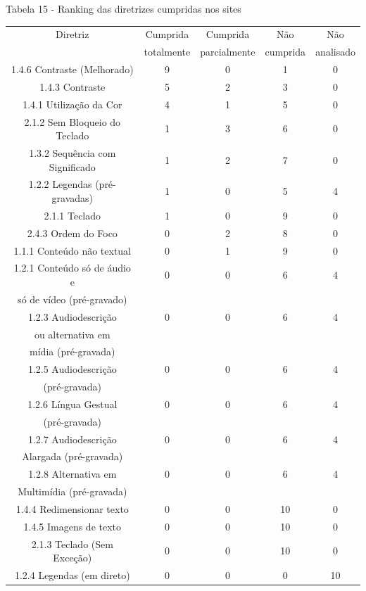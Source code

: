 \documentclass[a4paper]{article}
\begin{document}
\begin{titlepage}
Tabela 15 - Ranking das diretrizes cumpridas nos sites\\[-1cm]
\begin{center}
	\begin{longtable}{|c|c|c|c|c|}
		\hline
		Diretriz & Cumprida & Cumprida & Não & Não\\
		& totalmente & parcialmente & cumprida & analisado\\
		\hline
		1.4.6 Contraste (Melhorado) & 9 & 0 & 1 & 0 \\
		\hline
		1.4.3 Contraste & 5 & 2 & 3 & 0 \\
		\hline
		1.4.1 Utilização da Cor & 4 & 1 & 5 & 0 \\
		\hline
		2.1.2 Sem Bloqueio do Teclado & 1 & 3 & 6 & 0 \\
		\hline
		1.3.2 Sequência com Significado & 1 & 2 & 7 & 0 \\
		\hline
		1.2.2 Legendas (pré-gravadas) & 1 & 0 & 5 & 4 \\
		\hline
		2.1.1 Teclado & 1 & 0 & 9 & 0 \\
		\hline
		2.4.3 Ordem do Foco & 0 & 2 & 8 & 0 \\
		\hline
		1.1.1 Conteúdo não textual & 0 & 1 & 9 & 0 \\
		\hline
		1.2.1 Conteúdo só de áudio e & 0 & 0 & 6 & 4 \\
		só de vídeo (pré-gravado) & & & & \\
		\hline
		1.2.3 Audiodescrição & 0 & 0 & 6 & 4 \\
		ou alternativa em & & & & \\
		mídia (pré-gravada) & & & & \\
		\hline
		1.2.5 Audiodescrição & 0 & 0 & 6 & 4 \\
		(pré-gravada) & & & & \\
		\hline
		1.2.6 Língua Gestual & 0 & 0 & 6 & 4 \\
		(pré-gravada) & & & & \\
		\hline
		1.2.7 Audiodescrição & 0 & 0 & 6 & 4 \\
		Alargada (pré-gravada) & & & & \\
		\hline
		1.2.8 Alternativa em & 0 & 0 & 6 & 4 \\
		Multimídia (pré-gravada) & & & & \\
		\hline
		1.4.4 Redimensionar texto & 0 & 0 & 10 & 0 \\
		\hline
		1.4.5 Imagens de texto & 0 & 0 & 10 & 0 \\
		\hline
		2.1.3 Teclado (Sem Exceção) & 0 & 0 & 10 & 0 \\
		\hline
		1.2.4 Legendas (em direto) & 0 & 0 & 0 & 10 \\
		\hline
	\end{longtable}
\end{center}


\end{titlepage}
\end{document}
